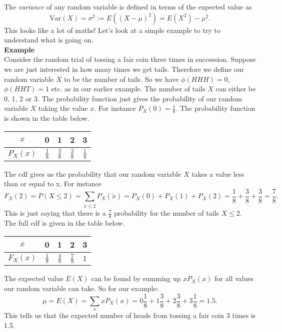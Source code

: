 The {\em variance} of any random variable is defined in terms of the expected value as
\begin{equation*}
\text{Var}(X)=\sigma^{2}:=E((X-\mu)^{2})=E(X^{2})-\mu^{2}.
\end{equation*}
This looks like a lot of maths! Let's look at a simple example to try to understand what is going on.\\
\newline
{\bf Example}\\
Consider the random trial of tossing a fair coin three times in succession. Suppose we are just interested in how many times we get tails. Therefore we define our random variable $X$ to be the number of tails. So we have $\phi(HHH)=0$, $\phi(HHT)=1$ etc. as in our earlier example. The number of tails $X$ can either be 0, 1, 2 or 3. The probability function just gives the probability of our random variable $X$ taking the value $x$. For instance $P_{X}(0)=\frac{1}{8}$. The probability function is shown in the table below. 

\begin{center}
\begin{tabular}{ |c|c|c|c|c| } 
 \hline
 $x$ & 0 & 1 & 2 & 3 \\ 
\hline $P_{X} (x)$& $\frac{1}{8}$ & $\frac{3}{8}$ & $\frac{3}{8}$ & $\frac{1}{8}$ \\
 \hline
\end{tabular}
\end{center}

The cdf gives us the probability that our random variable $X$ takes a value less than or equal to x. For instance
\begin{equation*}
F_{X}(2)=P(X\leq 2)=\sum_{\tilde{x} \leq 2} P_{X}(\tilde{x})=P_{X}(0)+P_{X}(1)+P_X(2)=\frac{1}{8}+\frac{3}{8}+\frac{3}{8}=\frac{7}{8}.
\end{equation*}
This is just saying that there is a $\frac{7}{8}$ probability for the number of tails $X\leq 2$. The full cdf is given in the table below.

\begin{center}
\begin{tabular}{ |c|c|c|c|c| } 
 \hline
 $x$ & 0 & 1 & 2 & 3 \\ 
\hline $F_{X} ( x)$& $\frac{1}{8}$ & $\frac{4}{8}$ & $\frac{7}{8}$ & $1$ \\
 \hline
\end{tabular}
\end{center}

The expected value $E(X)$ can be found by summing up $x P_{X}(x)$ for all values our random variable can take. So for our example:
\begin{equation*}
 \mu=E(X)=\sum_{x} x P_{X}(x)=0 \frac{1}{8}+1 \frac{3}{8} + 2 \frac{3}{8} + 3\frac{1}{8}=1.5.
\end{equation*}
This tells us that the expected number of heads from tossing a fair coin 3
times is 1.5.

